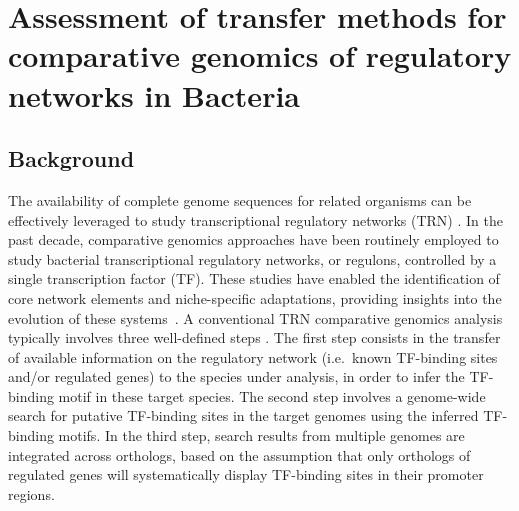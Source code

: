 
\chapter{Assessment of transfer methods for comparative genomics of regulatory
  networks in Bacteria}

\section{Background}

The availability of complete genome sequences for related organisms can be
effectively leveraged to study transcriptional regulatory networks (TRN)
\citep{babu2008computational}. In the past decade, comparative genomics
approaches have been routinely employed to study bacterial transcriptional
regulatory networks, or regulons, controlled by a single transcription factor
(TF). These studies have enabled the identification of core network elements
and niche-specific adaptations, providing insights into the evolution of these
systems~\citep{tan2001comparative, makarova2001conservation,
  erill2004differences, venancio2009reconstructing, baumbach2010power,
  rodionov2013transcriptional}. A conventional TRN comparative genomics
analysis typically involves three well-defined steps
\citep{babu2008computational, gelfand2000comparative, baumbach2009reliable}. The
first step consists in the transfer of available information on the regulatory
network (i.e.\ known TF-binding sites and/or regulated genes) to the species
under analysis, in order to infer the TF-binding motif in these target
species. The second step involves a genome-wide search for putative TF-binding
sites in the target genomes using the inferred TF-binding motifs. In the third
step, search results from multiple genomes are integrated across orthologs,
based on the assumption that only orthologs of regulated genes will
systematically display TF-binding sites in their promoter regions.

